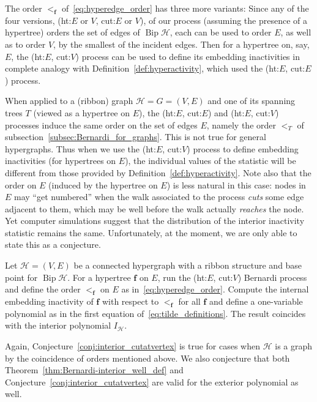 \documentclass[ALCO,ThmDefs,Unicode,epreuves]{cedram}
\newcommand{\HH}{\mathcal H}
\DeclareMathOperator{\bip}{Bip}
\begin{document}
The order $<_{\mathbf f}$ of~\eqref{eq:hyperedge_order} has three more variants: Since any of the four versions, (ht:$E$ or $V$, cut:$E$ or $V$), of our process (assuming the presence of a hypertree) orders the set of edges of $\bip\HH$, each can be used to order $E$, as well as to order $V$, by the smallest of the incident edges. Then for a hypertree on, say, $E$, the (ht:$E$, cut:$V$) process can be used to define its embedding inactivities in complete analogy with Definition~\ref{def:hyperactivity}, which used the (ht:$E$, cut:$E$) process.

When applied to a (ribbon) graph $\HH=G=(V,E)$ and one of its spanning trees $T$ (viewed as a hypertree on $E$), the (ht:$E$, cut:$E$) and (ht:$E$, cut:$V$) processes induce the same order on the set of edges $E$, namely the order $<_T$ of subsection~\ref{subsec:Bernardi_for_graphs}. This is not true for general hypergraphs. Thus when we use the (ht:$E$, cut:$V$) process to define embedding inactivities (for hypertrees on $E$), the individual values of the statistic will be different from those provided by Definition~\ref{def:hyperactivity}. Note also that the order on $E$ (induced by the hypertree on $E$) is less natural in this case: nodes in $E$ may ``get numbered'' when the walk associated to the process \emph{cuts} some edge adjacent to them, which may be well before the walk actually \emph{reaches} the node. Yet computer simulations suggest that the distribution of the interior inactivity statistic remains the same. Unfortunately, at the moment, we are only able to state this as a conjecture.

\begin{conj}
\label{conj:interior_cutatvertex}
Let $\HH=(V,E)$ be a connected hypergraph with a ribbon structure and base point for $\bip\HH$. For a hypertree $\mathbf f$ on $E$, run the (ht:$E$, cut:$V$) Bernardi process and define the order $<_{\mathbf f}$ on $E$ as in~\eqref{eq:hyperedge_order}. Compute the internal embedding inactivity of $\mathbf f$ with respect to $<_{\mathbf f}$ for all $\mathbf f$ and define a one-variable polynomial as in the first equation of~\eqref{eq:tilde_definitions}. The result coincides with the interior polynomial $I_\HH$. 
\end{conj}

Again, Conjecture~\ref{conj:interior_cutatvertex} is true for cases when $\HH$ is a graph by the coincidence of orders mentioned above. We also conjecture that both Theorem~\ref{thm:Bernardi-interior_well_def} and Conjecture~\ref{conj:interior_cutatvertex} are valid for the exterior polynomial as well.
\end{document}
